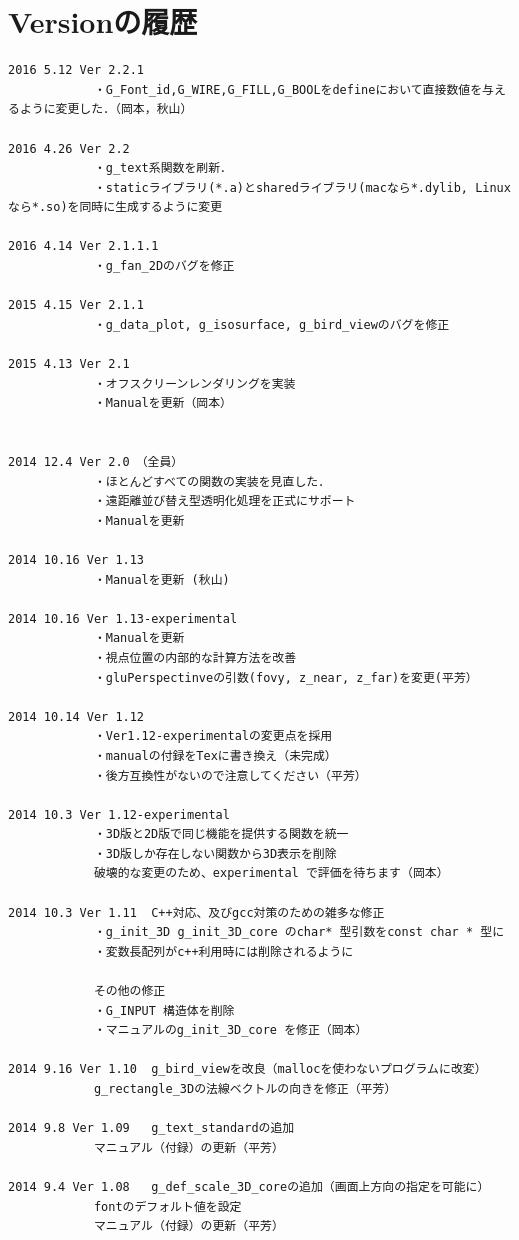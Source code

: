 \documentclass[platex,a4paper,12pt]{jsarticle}%
\begin{document}
\newpage
\section{Versionの履歴}

\begin{verbatim}
2016 5.12 Ver 2.2.1
			・G_Font_id,G_WIRE,G_FILL,G_BOOLをdefineにおいて直接数値を与えるように変更した．（岡本，秋山）
			
2016 4.26 Ver 2.2
			・g_text系関数を刷新．
			・staticライブラリ(*.a)とsharedライブラリ(macなら*.dylib, Linuxなら*.so)を同時に生成するように変更
			
2016 4.14 Ver 2.1.1.1
			・g_fan_2Dのバグを修正

2015 4.15 Ver 2.1.1
			・g_data_plot, g_isosurface, g_bird_viewのバグを修正

2015 4.13 Ver 2.1   
			・オフスクリーンレンダリングを実装
			・Manualを更新（岡本）


2014 12.4 Ver 2.0　（全員）
			・ほとんどすべての関数の実装を見直した．
			・遠距離並び替え型透明化処理を正式にサポート
			・Manualを更新
			
2014 10.16 Ver 1.13
			・Manualを更新 (秋山)

2014 10.16 Ver 1.13-experimental
			・Manualを更新
			・視点位置の内部的な計算方法を改善
			・gluPerspectinveの引数(fovy, z_near, z_far)を変更(平芳）

2014 10.14 Ver 1.12
			・Ver1.12-experimentalの変更点を採用
			・manualの付録をTexに書き換え（未完成）
			・後方互換性がないので注意してください（平芳）

2014 10.3 Ver 1.12-experimental
			・3D版と2D版で同じ機能を提供する関数を統一
			・3D版しか存在しない関数から3D表示を削除
			破壊的な変更のため、experimental で評価を待ちます（岡本）

2014 10.3 Ver 1.11	C++対応、及びgcc対策のための雑多な修正
			・g_init_3D g_init_3D_core のchar* 型引数をconst char * 型に
			・変数長配列がc++利用時には削除されるように

			その他の修正
			・G_INPUT 構造体を削除
			・マニュアルのg_init_3D_core を修正（岡本）

2014 9.16 Ver 1.10	g_bird_viewを改良（mallocを使わないプログラムに改変）
			g_rectangle_3Dの法線ベクトルの向きを修正（平芳）

2014 9.8 Ver 1.09	g_text_standardの追加
			マニュアル（付録）の更新（平芳）

2014 9.4 Ver 1.08	g_def_scale_3D_coreの追加（画面上方向の指定を可能に）
			fontのデフォルト値を設定
			マニュアル（付録）の更新（平芳）


\end{verbatim}
\end{document}
